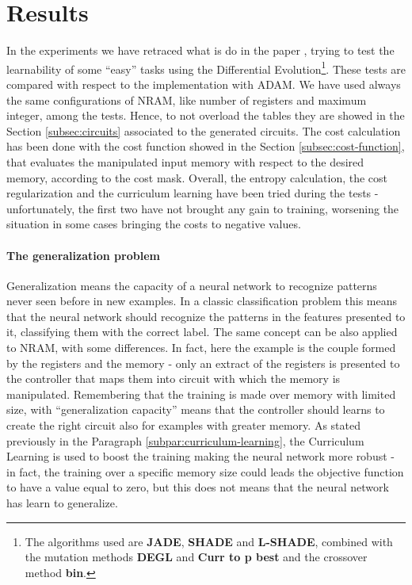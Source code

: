 \section{Results}
In the experiments we have retraced what is do in the paper \cite{NRAM:2016}, trying to test the learnability of some ``easy'' tasks using the Differential Evolution\footnote{The algorithms used are \textbf{JADE}, \textbf{SHADE} and \textbf{L-SHADE}, combined with the mutation methods \textbf{DEGL} and \textbf{Curr to p best} and the crossover method \textbf{bin}.}. These tests are compared with respect to the implementation with ADAM. We have used always the same configurations of NRAM, like number of registers and maximum integer, among the tests. Hence, to not overload the tables they are showed in the Section \ref{subsec:circuits} associated to the generated circuits. The cost calculation has been done with the cost function showed in the Section \ref{subsec:cost-function}, that evaluates the manipulated input memory with respect to the desired memory, according to the cost mask. Overall, the entropy calculation, the cost regularization and the curriculum learning have been tried during the tests - unfortunately, the first two have not brought any gain to training, worsening the situation in some cases bringing the costs to negative values.

\paragraph{The generalization problem}
Generalization means the capacity of a neural network to recognize patterns never seen before in new examples. In a classic classification problem this means that the neural network should recognize the patterns in the features presented to it, classifying them with the correct label. The same concept can be also applied to NRAM, with some differences. In fact, here the example is the couple formed by the registers and the memory - only an extract of the registers is presented to the controller that maps them into circuit with which the memory is manipulated. Remembering that the training is made over memory with limited size, with ``generalization capacity'' means that the controller should learns to create the right circuit also for examples with greater memory. As stated previously in the Paragraph \ref{subpar:curriculum-learning}, the Curriculum Learning is used to boost the training making the neural network more robust - in fact, the training over a specific memory size could leads the objective function to have a value equal to zero, but this does not means that the neural network has learn to generalize.

